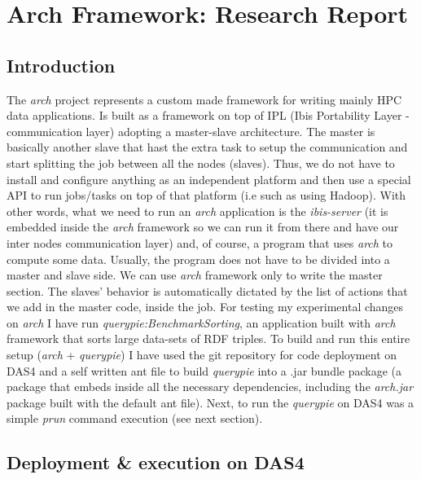 \section{Arch Framework: Research Report}

\subsection{Introduction}

The \textit{arch} project represents a custom made framework for writing mainly HPC data applications. Is built as a framework on top of IPL (Ibis Portability Layer - communication layer) adopting a master-slave architecture. The master is basically another slave that hast the extra task to setup the communication and start splitting the job between all the nodes (slaves). Thus, we do not have to install and configure anything as an independent platform and then use a special API to run jobs/tasks on top of that platform (i.e such as using Hadoop). With other words, what we need to run an \textit{arch} application is the \textit{ibis-server} (it is embedded inside the \textit{arch} framework so we can run it from there and have our inter nodes communication layer) and, of course, a program that uses \textit{arch} to compute some data. Usually, the program does not have to be divided into a master and slave side. We can use \textit{arch} framework only to write the master section. The slaves' behavior is automatically dictated by the list of actions that we add in the master code, inside the job. For testing my experimental changes on \textit{arch} I have run \textit{querypie:BenchmarkSorting}, an application built with \textit{arch} framework that sorts large data-sets of RDF triples. To build and run this entire setup (\textit{arch} + \textit{querypie}) I have used the git repository for code deployment on DAS4 and a self written ant file \cite{build_file} to build \textit{querypie} into a .jar bundle package (a package that embeds inside all the necessary dependencies, including the \textit{arch.jar} package built with the default ant file). Next, to run the \textit{querypie} on DAS4 was a simple \textit{prun} command execution (see next section).

% 
\subsection{Deployment \& execution on DAS4}

